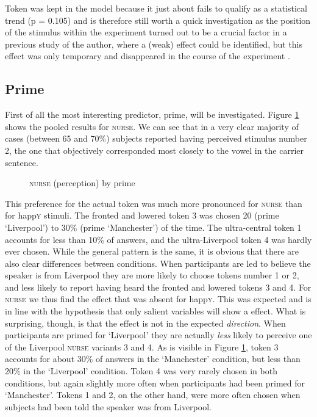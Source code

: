 Token was kept in the model because it just about fails to qualify as a statistical trend (p = 0.105) and is therefore still worth a quick investigation as the position of the stimulus within the experiment turned out to be a crucial factor in a previous study of the author, where a (weak)  effect could be identified, but this effect was only temporary and disappeared in the course of the experiment \parencite[cf.][]{juskanma}.

\subsection{Prime}
\label{sec.perc_res.nurse.prime}

First of all the most interesting predictor, prime, will be investigated.
Figure \ref{fig.bar.nurse.tot.ext} shows the pooled results for \textsc{nurse}.
We can see that in a very clear majority of cases (between 65 and 70\%) subjects reported having perceived stimulus number 2, the one that objectively corresponded most closely to the vowel in the carrier sentence.

\begin{figure}[h]
	\centering
		\resizebox{.49\linewidth}{!}{} 
	\caption{\textsc{nurse} (perception) by prime}
	\label{fig.bar.nurse.tot.ext}
\end{figure}

This preference for the actual token was much more pronounced for \textsc{nurse} than for happ\textsc{y} stimuli.
The fronted and lowered token 3 was chosen 20 (prime `Liverpool') to 30\% (prime `Manchester') of the time.
The ultra-central token 1 accounts for less than 10\% of answers, and the ultra-Liverpool token 4 was hardly ever chosen.
While the general pattern is the same, it is obvious that there are also clear differences between  conditions.
When participants are led to believe the speaker is from Liverpool they are more likely to choose tokens number 1 or 2, and less likely to report having heard the fronted and lowered tokens 3 and 4.
For \textsc{nurse} we thus find the  effect that was absent for happ\textsc{y}.
This was expected and is in line with the hypothesis that only salient variables will show a  effect.
What is surprising, though, is that the  effect is not in the expected \emph{direction}.
When participants are primed for `Liverpool' they are actually \emph{less} likely to perceive one of the Liverpool \textsc{nurse} variants 3 and 4.
As is visible in Figure \ref{fig.bar.nurse.tot.ext}, token 3 accounts for about 30\% of answers in the `Manchester' condition, but less than 20\% in the `Liverpool' condition.
Token 4 was very rarely chosen in both conditions, but again slightly more often when participants had been primed for `Manchester'.
Tokens 1 and 2, on the other hand, were more often chosen when subjects had been told the speaker was from Liverpool.


